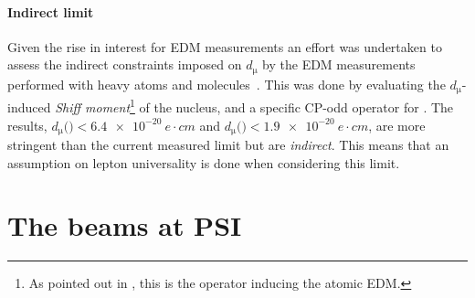 \begin{refsection}
            \paragraph{Indirect limit} Given the rise in interest for EDM measurements an effort was undertaken to assess the indirect constraints imposed on $d_\upmu$ by the EDM measurements performed with heavy atoms and molecules~\cite{muEDM:indirect}. 
            This was done by evaluating the $d_\upmu$- induced \textit{Shiff moment}\footnote{As pointed out in \cite{Shiff}, this is the operator inducing the atomic EDM.} of the  nucleus, and a specific CP-odd operator for .            
            The results, $d_\upmu($$)<\SI{6.4e-20}{e\cdot cm}$ and $d_\upmu($$)<\SI{1.9e-20}{e\cdot cm}$, are more stringent than the current measured limit but are \textit{indirect}.
            This means that an assumption on lepton universality is done when considering this limit. 
      
\section{The beams at PSI}
    \label{intro:beamlines}
    

\end{refsection}
